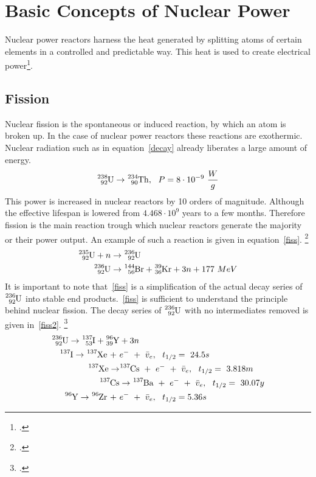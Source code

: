 \chapter{Basic Concepts of Nuclear Power}
Nuclear power reactors harness the heat generated by splitting atoms of certain
elements in a controlled and predictable way. This heat is used to create electrical power\footcite{WNPR}.
\section{Fission}
Nuclear fission is the spontaneous or induced reaction, by which an atom is broken up. In the
case of nuclear power reactors these reactions are exothermic. Nuclear radiation such as in equation~\ref{decay}
already liberates a large amount of energy.
\begin{equation} \label{decay}
    \ce{^{238}_{92}U} \rightarrow \ce{^{234}_{90}Th}, ~~P = 8 \cdot 10^{-9} ~\frac{W}{g}
\end{equation}
This power is increased in nuclear reactors by 10 orders of magnitude. Although the effective lifespan
is lowered from $4.468 \cdot 10^{9}$ years to a few months. Therefore fission is the main reaction
trough which nuclear reactors generate the majority or their power output. An example of such
a reaction is given in equation~\ref{fiss}. \footcite[286]{nucfundamentals}
\begin{equation} \label{fiss}
\begin{split}
    \ce{^{235}_{92}U} + n & \rightarrow \ce{^{236}_{92}U} \\
    \ce{^{236}_{92}U} & \rightarrow \ce{^{144}_{56}Br} + \ce{^{39}_{36}Kr} + 3n + 177 ~MeV
\end{split}
\end{equation}
It is important to note that~\ref{fiss} is a simplification of the actual decay series of $\ce{^{236}_{92}U}$ into
stable end products.~\ref{fiss} is sufficient to understand the principle behind nuclear fission.
The decay series of $\ce{^{236}_{92}U}$ with no intermediates removed is given in~\ref{fiss2}. \footcite[287]{nucfundamentals}
\begin{equation} \label{fiss2}
    \begin{split}
        \ce{^{236}_{92}U} \rightarrow \ce{^{137}_{53}I} + \ce{^{96}_{39}Y} & + 3n \\
            \ce{^{137}I} \rightarrow \ce{^{137}Xe} ~+~ & e^{-} ~+~ \bar{v}_{e}, ~~t_{1/2}=~24.5s \\
                \ce{^{137}Xe} \rightarrow & \ce{^{137}Cs} ~+~ e^{-} ~+~ \bar{v}_{e}, ~~t_{1/2}=~3.818m \\
                    \ce{^{137}Cs}& \rightarrow \ce{^{137}Ba} ~+~ e^{-} ~+~ \bar{v}_{e}, ~~t_{1/2}=~30.07y \\
            \ce{^{96}Y} \rightarrow \ce{^{96}Zr} ~+~ & e^{-} ~+~ \bar{v}_{e}, ~~t_{1/2}=5.36s 
    \end{split}
\end{equation}

